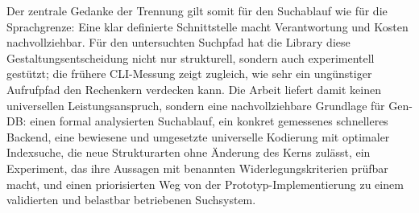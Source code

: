 \documentclass[a4paper,12pt, twoside]{report}
\theoremstyle{definition}
\begin{document}
Der zentrale Gedanke der Trennung gilt somit für den Suchablauf wie für die Sprachgrenze: Eine klar definierte Schnittstelle macht Verantwortung und Kosten nachvollziehbar. Für den untersuchten Suchpfad hat die Library diese Gestaltungsentscheidung nicht nur strukturell, sondern auch experimentell gestützt; die frühere CLI-Messung zeigt zugleich, wie sehr ein ungünstiger Aufrufpfad den Rechenkern verdecken kann. Die Arbeit liefert damit keinen universellen Leistungsanspruch, sondern eine nachvollziehbare Grundlage für Gen-DB: einen formal analysierten Suchablauf, ein konkret gemessenes schnelleres Backend, eine bewiesene und umgesetzte universelle Kodierung mit optimaler Indexsuche, die neue Strukturarten ohne Änderung des Kerns zulässt, ein Experiment, das ihre Aussagen mit benannten Widerlegungskriterien prüfbar macht, und einen priorisierten Weg von der Prototyp-Implementierung zu einem validierten und belastbar betriebenen Suchsystem.
\end{document}
